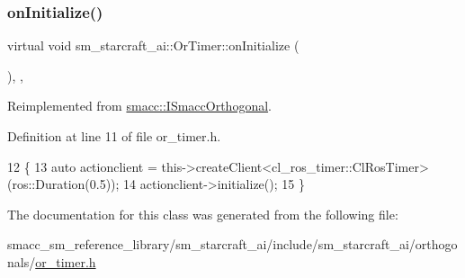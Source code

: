 \subsubsection{\texorpdfstring{on\+Initialize()}{onInitialize()}}
{\footnotesize\ttfamily virtual void sm\+\_\+starcraft\+\_\+ai\+::\+Or\+Timer\+::on\+Initialize (\begin{DoxyParamCaption}{ }\end{DoxyParamCaption})\hspace{0.3cm}{\ttfamily [inline]}, {\ttfamily [override]}, {\ttfamily [virtual]}}



Reimplemented from \hyperlink{classsmacc_1_1ISmaccOrthogonal_a6bb31c620cb64dd7b8417f8705c79c7a}{smacc\+::\+I\+Smacc\+Orthogonal}.



Definition at line 11 of file or\+\_\+timer.\+h.


\begin{DoxyCode}
12     \{
13         \textcolor{keyword}{auto} actionclient = this->createClient<cl\_ros\_timer::ClRosTimer>(ros::Duration(0.5));
14         actionclient->initialize();
15     \}
\end{DoxyCode}


The documentation for this class was generated from the following file\+:\begin{DoxyCompactItemize}
\item 
smacc\+\_\+sm\+\_\+reference\+\_\+library/sm\+\_\+starcraft\+\_\+ai/include/sm\+\_\+starcraft\+\_\+ai/orthogonals/\hyperlink{smacc__sm__reference__library_2sm__starcraft__ai_2include_2sm__starcraft__ai_2orthogonals_2or__timer_8h}{or\+\_\+timer.\+h}\end{DoxyCompactItemize}
